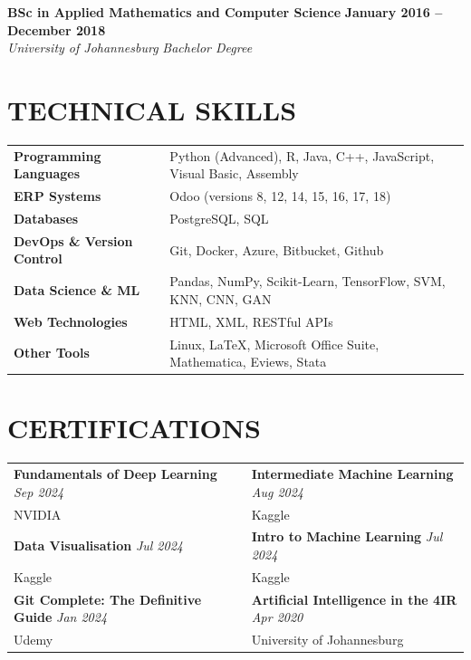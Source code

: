 \documentclass[10pt,a4paper]{article}
\begin{document}
\vspace{0.35em}

\textbf{\color{primary} BSc in Applied Mathematics and Computer Science} \hfill \textbf{\color{secondary} January 2016 -- December 2018} \\
\textit{University of Johannesburg} \hfill \textit{Bachelor Degree}

\section*{TECHNICAL SKILLS}
\begin{tabularx}{\textwidth}{@{} >{\bfseries\color{primary}}p{4.6cm} X @{}}
Programming Languages & Python (Advanced), R, Java, C++, JavaScript, Visual Basic, Assembly \\
ERP Systems & Odoo (versions 8, 12, 14, 15, 16, 17, 18) \\
Databases & PostgreSQL, SQL \\
DevOps \& Version Control & Git, Docker, Azure, Bitbucket, Github \\
Data Science \& ML & Pandas, NumPy, Scikit-Learn, TensorFlow, SVM, KNN, CNN, GAN \\
Web Technologies & HTML, XML, RESTful APIs \\
Other Tools & Linux, LaTeX, Microsoft Office Suite, Mathematica, Eviews, Stata \\
\end{tabularx}

\section*{CERTIFICATIONS}
\begin{tabularx}{\textwidth}{@{} X X @{}}
\textbf{Fundamentals of Deep Learning} \hfill \textit{Sep 2024} & \textbf{Intermediate Machine Learning} \hfill \textit{Aug 2024} \\
{\small NVIDIA} & {\small Kaggle} \\[0.3em]
\textbf{Data Visualisation} \hfill \textit{Jul 2024} & \textbf{Intro to Machine Learning} \hfill \textit{Jul 2024} \\
{\small Kaggle} & {\small Kaggle} \\[0.3em]
\textbf{Git Complete: The Definitive Guide} \hfill \textit{Jan 2024} & \textbf{Artificial Intelligence in the 4IR} \hfill \textit{Apr 2020} \\
{\small Udemy} & {\small University of Johannesburg} \\
\end{tabularx}
\end{document}
